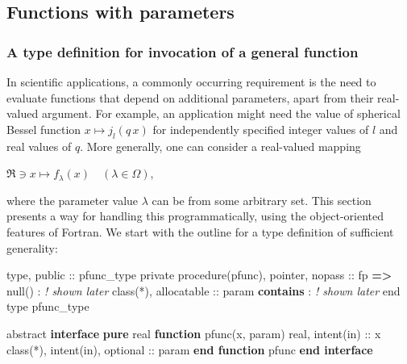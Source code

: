 \documentclass[
  paper=a4,
  ,captions=tableheading
]{scrartcl}
\newenvironment{Shaded}{\begin{snugshade}}{\end{snugshade}}
\newcommand{\CommentTok}[1]{\textcolor[rgb]{0.56,0.35,0.01}{\textit{#1}}}
\newcommand{\DataTypeTok}[1]{\textcolor[rgb]{0.13,0.29,0.53}{#1}}
\newcommand{\KeywordTok}[1]{\textcolor[rgb]{0.13,0.29,0.53}{\textbf{#1}}}
\newcommand{\NormalTok}[1]{#1}
\newcommand{\OperatorTok}[1]{\textcolor[rgb]{0.81,0.36,0.00}{\textbf{#1}}}
\begin{document}
\subsection{Functions with
parameters}\label{sec:functions_with_parameters}

\subsubsection{A type definition for invocation of a general
function}\label{a-type-definition-for-invocation-of-a-general-function}

In scientific applications, a commonly occurring requirement is the need
to evaluate functions that depend on additional parameters, apart from
their real-valued argument. For example, an application might need the
value of spherical Bessel function \(x \mapsto j_l(q \, x)\) for
independently specified integer values of \(l\) and real values of
\(q\). More generally, one can consider a real-valued mapping

\(\Re \ni x \mapsto f_\lambda(x) \quad (\lambda \in \Omega)\),

where the parameter value \(\lambda\) can be from some arbitrary set.
This section presents a way for handling this programmatically, using
the object-oriented features of Fortran. We start with the outline for a
type definition of sufficient generality:

\begin{Shaded}
\begin{Highlighting}[]
\DataTypeTok{type}\NormalTok{, }\DataTypeTok{public} \DataTypeTok{::}\NormalTok{ pfunc\_type}
  \DataTypeTok{private}
  \DataTypeTok{procedure(pfunc)}\NormalTok{, }\DataTypeTok{pointer}\NormalTok{, }\DataTypeTok{nopass} \DataTypeTok{::}\NormalTok{ fp }\KeywordTok{=}\OperatorTok{\textgreater{}}\NormalTok{ null()}
\NormalTok{  : }\CommentTok{! shown later}
  \DataTypeTok{class(*)}\NormalTok{, }\DataTypeTok{allocatable} \DataTypeTok{::}\NormalTok{ param}
\KeywordTok{contains}
\NormalTok{  : }\CommentTok{! shown later}
\DataTypeTok{end type}\NormalTok{ pfunc\_type}

\DataTypeTok{abstract} \KeywordTok{interface}
  \KeywordTok{pure} \DataTypeTok{real} \KeywordTok{function}\NormalTok{ pfunc(x, param)}
    \DataTypeTok{real}\NormalTok{, }\DataTypeTok{intent(in)} \DataTypeTok{::}\NormalTok{ x}
    \DataTypeTok{class(*)}\NormalTok{, }\DataTypeTok{intent(in)}\NormalTok{, }\DataTypeTok{optional} \DataTypeTok{::}\NormalTok{ param}
  \KeywordTok{end function}\NormalTok{ pfunc}
\KeywordTok{end interface}
\end{Highlighting}
\end{Shaded}
\end{document}
